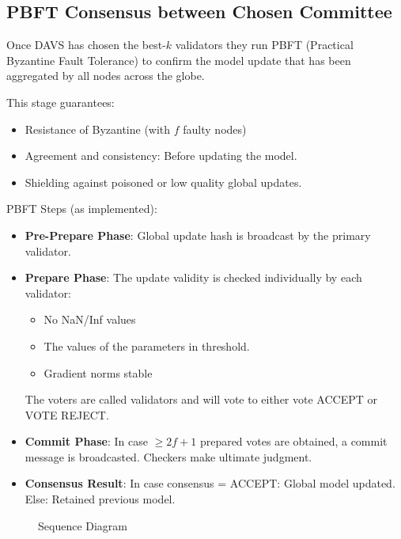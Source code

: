 \documentclass[12pt,a4paper]{article}
\begin{document}
\subsection{PBFT Consensus between Chosen Committee}
Once DAVS has chosen the best-$k$ validators they run PBFT (Practical Byzantine Fault Tolerance) to confirm the model update that has been aggregated by all nodes across the globe.

This stage guarantees:
\begin{itemize}
    \item Resistance of Byzantine (with $f$ faulty nodes)
    \item Agreement and consistency: Before updating the model.
    \item Shielding against poisoned or low quality global updates.
\end{itemize}

PBFT Steps (as implemented):
\begin{itemize}
    \item \textbf{Pre-Prepare Phase}: Global update hash is broadcast by the primary validator.
    \item \textbf{Prepare Phase}: The update validity is checked individually by each validator:
    \begin{itemize}
        \item No NaN/Inf values
        \item The values of the parameters in threshold.
        \item Gradient norms stable
    \end{itemize}
    The voters are called validators and will vote to either vote ACCEPT or VOTE REJECT.
    \item \textbf{Commit Phase}: In case $\geq 2f+1$ prepared votes are obtained, a commit message is broadcasted. Checkers make ultimate judgment.
    \item \textbf{Consensus Result}: In case consensus = ACCEPT: Global model updated. Else: Retained previous model.
\end{itemize}

\begin{figure}[h]
    \centering
    \fbox{\rule{0pt}{2in} \rule{0.9\linewidth}{0pt}}
    \caption{Sequence Diagram}
\end{figure}
\end{document}
